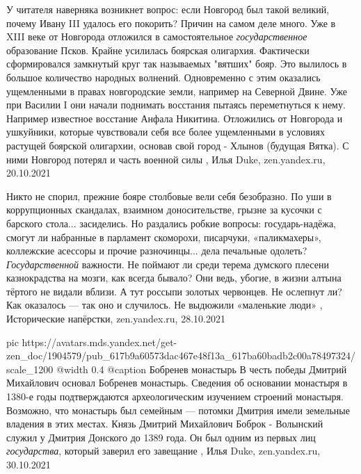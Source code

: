 У читателя наверняка возникнет вопрос: если Новгород был такой великий, почему
Ивану III удалось его покорить? Причин на самом деле много. Уже в XIII веке от
Новгорода отложился в самостоятельное \emph{государственное} образование Псков. Крайне
усилилась боярская олигархия. Фактически сформировался замкнутый круг так
называемых "вятших" бояр. Это вылилось в большое количество народных волнений.
Одновременно с этим оказались ущемленными в правах новгородские земли, например
на Северной Двине. Уже при Василии I они начали поднимать восстания пытаясь
переметнуться к нему. Например известное восстание Анфала Никитина. Отложились
от Новгорода и ушкуйники, которые чувствовали себя все более ущемленными в
условиях растущей боярской олигархии, основав свой город - Хлынов (будущая
Вятка). С ними Новгород потерял и часть военной силы
, Илья Duke, zen.yandex.ru, 20.10.2021

Никто не спорил, прежние бояре столбовые вели себя безобразно. По уши в
коррупционных скандалах, взаимном доносительстве, грызне за кусочки с барского
стола... засиделись. Но раздались робкие вопросы: государь-надёжа, смогут ли
набранные в парламент скоморохи, писарчуки, «паликмахеры», коллежские асессоры
и прочие разночинцы... дела печальные одолеть? \emph{Государственной} важности.
Не поймают ли среди терема думского плесени казнокрадства на мозги, как всегда
бывало? Они ведь, убогие, в жизни алтына тёртого не видали вблизи. А тут
россыпи золотых червонцев. Не ослепнут ли? Как оказалось — так оно и случилось.
Не выдюжили «маленькие люди»
, 
Исторические напёрстки, zen.yandex.ru, 28.10.2021

\ifcmt
  pic https://avatars.mds.yandex.net/get-zen_doc/1904579/pub_617b9a60573dac467e48f13a_617ba60badb2c00a78497324/scale_1200
  @width 0.4
	@caption Бобренев монастырь
\fi
В честь победы Дмитрий Михайлович основал Бобренев монастырь. Сведения об
основании монастыря в 1380-е годы подтверждаются археологическим изучением
строений монастыря. Возможно, что монастырь был семейным — потомки Дмитрия
имели земельные владения в этих местах.  Князь Дмитрий Михайлович Боброк -
Волынский служил у Дмитрия Донского до 1389 года. Он был одним из первых лиц
\emph{государства}, который заверил его завещание
, Илья Duke, zen.yandex.ru, 30.10.2021

